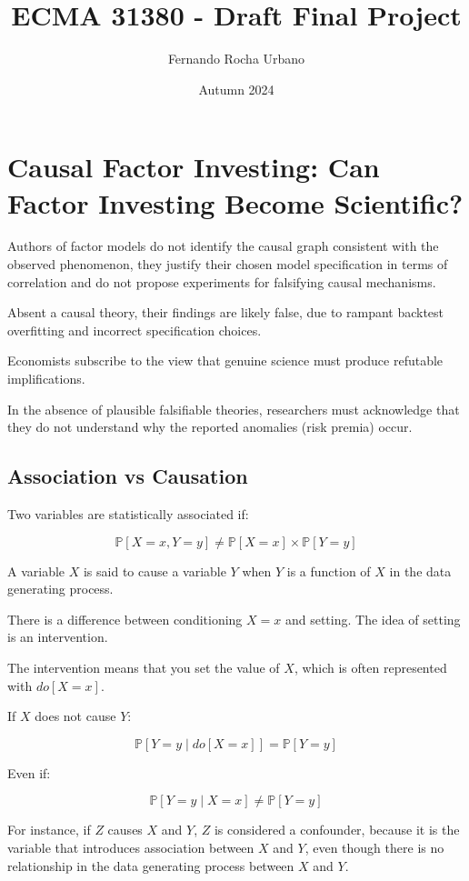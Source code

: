 \documentclass{article}
\title{ECMA 31380 - Draft Final Project}
\author{Fernando Rocha Urbano}
\date{Autumn 2024}
\begin{document}
\maketitle

\section{Causal Factor Investing: Can Factor Investing Become Scientific?}

Authors of factor models do not identify the causal graph consistent with the observed phenomenon, they justify their chosen model specification in terms of correlation and do not propose experiments for falsifying causal mechanisms.

Absent a causal theory, their findings are likely false, due to rampant backtest overfitting and incorrect specification choices.

Economists subscribe to the view that genuine science must produce refutable implifications.

In the absence of plausible falsifiable theories, researchers must acknowledge that they do not understand why the reported anomalies (risk premia) occur.

\subsection{Association vs Causation}

Two variables are statistically associated if:

$$
\mathbb{P}[X = x, Y = y] \neq \mathbb{P}[X = x] \times \mathbb{P}[Y = y]
$$

A variable $X$ is said to cause a variable $Y$ when $Y$ is a function of $X$ in the data generating process.

There is a difference between conditioning $X = x$ and setting. The idea of setting is an intervention.

The intervention means that you set the value of $X$, which is often represented with $do[X = x]$.

If $X$ does not cause $Y$:

$$
\mathbb{P}[Y = y \mid do[X = x]] = \mathbb{P}[Y = y]
$$

Even if:

$$
\mathbb{P}[Y = y \mid X = x] \neq \mathbb{P}[Y = y]
$$

For instance, if $Z$ causes $X$ and $Y$, $Z$ is considered a confounder, because it is the variable that introduces association between $X$ and $Y$, even though there is no relationship in the data generating process between $X$ and $Y$.
\end{document}

